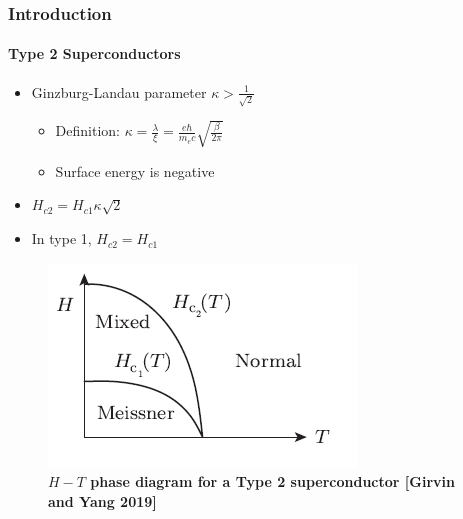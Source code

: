 \documentclass[12pt]{beamer}
\begin{document}
\begin{frame}
\frametitle{Introduction}
\framesubtitle{Type 2 Superconductors}

\begin{itemize}
  \pause
  \item Ginzburg-Landau parameter \(\kappa > \frac{1}{\sqrt{2}}\)
  \pause
  \begin{itemize}
    \item Definition: \(\kappa = \frac{\lambda}{\xi} = \frac{e \hbar}{m_e c} \sqrt{\frac{\beta}{2 \pi}} \)
    \item Surface energy is negative
  \end{itemize}
  \pause
  \item \(H_{c2} = H_{c1} \kappa \sqrt{2}\)
  \pause
  \item In type 1, \(H_{c2} = H_{c1}\)
  \pause
\end{itemize}

\begin{figure}[h]
  \includegraphics[scale = 0.5]{Type2.png}
  \caption{\textbf{\(H-T\) phase diagram for a Type 2 superconductor [Girvin and Yang 2019]}}
\end{figure}



\end{frame}
\end{document}
